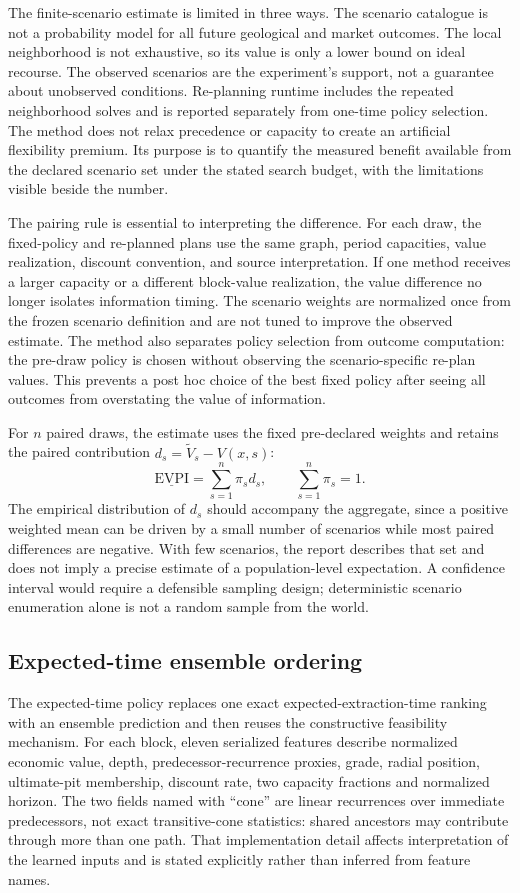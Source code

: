 The finite-scenario estimate is limited in three ways. The scenario catalogue is not a probability model for all future geological and market outcomes. The local neighborhood is not exhaustive, so its value is only a lower bound on ideal recourse. The observed scenarios are the experiment's support, not a guarantee about unobserved conditions. Re-planning runtime includes the repeated neighborhood solves and is reported separately from one-time policy selection. The method does not relax precedence or capacity to create an artificial flexibility premium. Its purpose is to quantify the measured benefit available from the declared scenario set under the stated search budget, with the limitations visible beside the number.

The pairing rule is essential to interpreting the difference. For each draw, the fixed-policy and re-planned plans use the same graph, period capacities, value realization, discount convention, and source interpretation. If one method receives a larger capacity or a different block-value realization, the value difference no longer isolates information timing. The scenario weights are normalized once from the frozen scenario definition and are not tuned to improve the observed estimate. The method also separates policy selection from outcome computation: the pre-draw policy is chosen without observing the scenario-specific re-plan values. This prevents a post hoc choice of the best fixed policy after seeing all outcomes from overstating the value of information.

For $n$ paired draws, the estimate uses the fixed pre-declared weights and retains the paired contribution $d_s=\tilde V_s-V(x,s)$:
\begin{equation}
 \underline{\mathrm{EVPI}}=\sum_{s=1}^{n}\pi_s d_s,
 \qquad \sum_{s=1}^{n}\pi_s=1.
\end{equation}
The empirical distribution of $d_s$ should accompany the aggregate, since a positive weighted mean can be driven by a small number of scenarios while most paired differences are negative. With few scenarios, the report describes that set and does not imply a precise estimate of a population-level expectation. A confidence interval would require a defensible sampling design; deterministic scenario enumeration alone is not a random sample from the world.

\subsection{Expected-time ensemble ordering}
\label{sec:method-expected-time}
The expected-time policy replaces one exact expected-extraction-time ranking with an ensemble prediction and then reuses the constructive feasibility mechanism. For each block, eleven serialized features describe normalized economic value, depth, predecessor-recurrence proxies, grade, radial position, ultimate-pit membership, discount rate, two capacity fractions and normalized horizon. The two fields named with “cone” are linear recurrences over immediate predecessors, not exact transitive-cone statistics: shared ancestors may contribute through more than one path. That implementation detail affects interpretation of the learned inputs and is stated explicitly rather than inferred from feature names.

